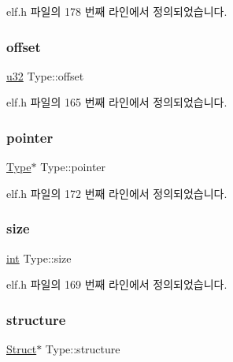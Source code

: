 elf.\+h 파일의 178 번째 라인에서 정의되었습니다.

\mbox{\label{struct_type_a1da9bf1a40d9e23c0c03b291b00e7521}} 
\subsubsection{\texorpdfstring{offset}{offset}}
{\footnotesize\ttfamily \mbox{\hyperlink{_system_8h_a10e94b422ef0c20dcdec20d31a1f5049}{u32}} Type\+::offset}



elf.\+h 파일의 165 번째 라인에서 정의되었습니다.

\mbox{\label{struct_type_a47e2e4b5c179cc331ce50ebba3b9308b}} 
\subsubsection{\texorpdfstring{pointer}{pointer}}
{\footnotesize\ttfamily \mbox{\hyperlink{struct_type}{Type}}$\ast$ Type\+::pointer}



elf.\+h 파일의 172 번째 라인에서 정의되었습니다.

\mbox{\label{struct_type_a871302dc63ac1a37c0b6a225cf82048d}} 
\subsubsection{\texorpdfstring{size}{size}}
{\footnotesize\ttfamily \mbox{\hyperlink{_util_8cpp_a0ef32aa8672df19503a49fab2d0c8071}{int}} Type\+::size}



elf.\+h 파일의 169 번째 라인에서 정의되었습니다.

\mbox{\label{struct_type_a2db050f37fd4bd027748355abf258dcf}} 
\subsubsection{\texorpdfstring{structure}{structure}}
{\footnotesize\ttfamily \mbox{\hyperlink{struct_struct}{Struct}}$\ast$ Type\+::structure}



